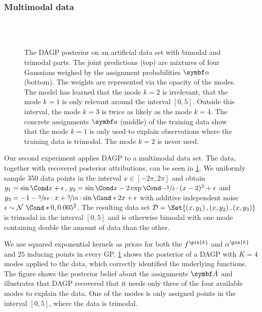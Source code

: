 \subsubsection{Multimodal data}
\label{toc:data_association:semi_bimodal}
%
\begin{figure}[tp]
    \centering
    \\%
    \vspace{\figureskip}%
    \\%
    \vspace{\figureskip}%
    \caption[Multimodality experiment]{
        \label{fig:data_association:semi_bimodal}
        The DAGP posterior on an artificial data set with bimodal and trimodal parts.
        The joint predictions (top) are mixtures of four Gaussians weighed by the assignment probabilities $\mat{\alpha}$ (bottom).
        The weights are represented via the opacity of the modes.
        The model has learned that the mode $k = 2$ is irrelevant, that the mode $k = 1$ is only relevant around the interval $[0, 5]$.
        Outside this interval, the mode $k = 3$ is twice as likely as the mode $k = 4$.
        The concrete assignments $\mat{a}$ (middle) of the training data show that the mode $k = 1$ is only used to explain observations where the training data is trimodal.
        The mode $k = 2$ is never used.
    }
\end{figure}
%
Our second experiment applies DAGP to a multimodal data set.
The data, together with recovered posterior attributions, can be seen in \cref{fig:data_association:semi_bimodal}.
We uniformly sample 350 data points in the interval $x \in [-2\pi, 2\pi]$ and obtain $y_1 = \Fun{\sin}{x} + \epsilon$, $y_2 = \Fun{\sin}{x} - 2 \Fun{\exp}{-\sfrac{1}{2} \cdot (x-2)^2} + \epsilon$ and $y_3 = -1 - \sfrac{3}{8\pi} \cdot x + \sfrac{3}{10} \cdot \Fun*{\sin}{2x} + \epsilon$ with additive independent noise $\epsilon \sim \Gaussian*{0, 0.005^2}$.
The resulting data set $\Dc = \Set{\left( x, y_1 \right), \left( x, y_2 \right), \left( x, y_3 \right)}$ is trimodal in the interval $[0, 5]$ and is otherwise bimodal with one mode containing double the amount of data than the other.

We use squared exponential kernels as priors for both the $f^{\pix{k}}$ and $\alpha^{\pix{k}}$ and $25$ inducing points in every GP.
\cref{fig:data_association:semi_bimodal} shows the posterior of a DAGP with $K = 4$ modes applied to the data, which correctly identified the underlying functions.
The figure shows the posterior belief about the assignments $\mat{A}$ and illustrates that DAGP recovered that it needs only three of the four available modes to explain the data.
One of the modes is only assigned points in the interval $[0, 5]$, where the data is trimodal.

